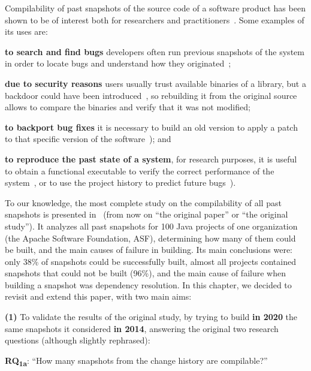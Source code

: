 Compilability of past snapshots of the source code of a software product has been shown to be of interest both for researchers and practitioners~\cite{nikitin2017chainiac,RepBlds:2017:Online}. 
Some examples of its uses are:
\begin{inparaenum}[\bf(1)]
	\item {\bf to search and find bugs} developers often run previous snapshots of the system in order to locate bugs and understand how they originated~\cite{Zimmermann:2006:MVA:1137983.1138001};
	\item {\bf due to security reasons} users usually trust available binaries of a library, but a backdoor could have been introduced~\cite{deCarnedeCarnavalet:2014:CIV:2664243.2664288}, so rebuilding it from the original source allows to compare the binaries and verify that it was not modified; 
	\item {\bf to backport bug fixes} it is necessary to build an old version to apply a patch to that specific version of the software~\cite{tian2017mining}); and
	\item {\bf to reproduce the past state of a system}, for research purposes, it is useful to obtain a functional executable to verify the correct performance of the system~\cite{manacero2011using}, or to use the project history to predict future bugs~\cite{Zimmermann2008}).
\end{inparaenum}

To our knowledge, the most complete study on the compilability of all past snapshots is presented in~\cite{tufano2017there} (from now on ``the original paper'' or ``the original study''). It analyzes all past snapshots for 100 Java projects of one organization (the Apache Software Foundation, ASF), determining how many of them could be built, and the main causes of failure in building. Its main conclusions were: only 38\% of snapshots could be successfully built, almost all projects contained snapshots that could not be built (96\%), and the main cause of failure when building a snapshot was dependency resolution. In this chapter, we decided to revisit and extend this paper, with two main aims:

\textbf{(1)} To validate the results of the original study, by trying to build {\bf in 2020} the same snapshots it considered {\bf in 2014}, answering the original two research questions (although slightly rephrased):

\textbf{RQ\textsubscript{1a}}: ``How many snapshots from the change history are compilable?''

